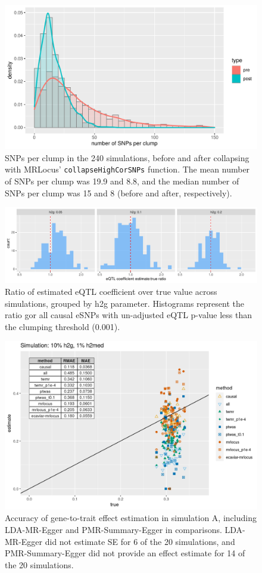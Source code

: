 \documentclass[11pt]{article}
\begin{document}
\begin{figure}[!ht]
  \centering
  \includegraphics[width=.7\textwidth]{figs/snps_per_clump}
  \caption{SNPs per clump in the 240 simulations, before and after
    collapsing with MRLocus’ \texttt{collapseHighCorSNPs}
    function. The mean number of SNPs per clump was 19.9 and 8.8, and
    the median number of SNPs per clump was 15 and 8 (before and
    after, respectively).}
\end{figure}

\begin{figure}[!ht]
  \centering
  \includegraphics[width=\textwidth]{figs/sim_overest}
  \caption{Ratio of estimated eQTL coefficient over true value across
    simulations, grouped by h2g parameter. Histograms represent the
    ratio gor all causal eSNPs with un-adjusted eQTL p-value less than
    the clumping threshold (0.001).}
\end{figure}

\begin{figure}[!ht]
  \centering
  \includegraphics[width=.7\textwidth]{figs/sim1extra.png}
  \caption{Accuracy of gene-to-trait effect estimation in simulation
    A, including LDA-MR-Egger and PMR-Summary-Egger in
    comparisons. LDA-MR-Egger did not estimate SE for 6 of the 20
    simulations, and PMR-Summary-Egger did not provide an effect
    estimate for 14 of the 20 simulations.}
\end{figure}
\end{document}
